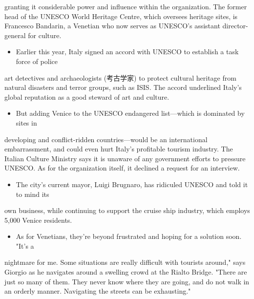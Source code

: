 \documentclass[UTF8,11pt]{ctexart}
\begin{document}
granting it considerable power and influence within the organization. The former head of the UNESCO World Heritage Centre, which oversees heritage sites, is Francesco Bandarin, a Venetian who now serves as UNESCO's assistant director-general for culture.


\begin{itemize}[leftmargin=2em,itemsep=.2em,topsep=.4em]\item[J.] Earlier this year, Italy signed an accord with UNESCO to establish a task force of police
\end{itemize}

art detectives and archaeologists (考古学家) to protect cultural heritage from natural disasters and terror groups, such as ISIS. The accord underlined Italy's global reputation as a good steward of art and culture.


\begin{itemize}[leftmargin=2em,itemsep=.2em,topsep=.4em]\item[K.] But adding Venice to the UNESCO endangered list—which is dominated by sites in
\end{itemize}

developing and conflict-ridden countries—would be an international embarrassment, and could even hurt Italy's profitable tourism industry. The Italian Culture Ministry says it is unaware of any government efforts to pressure UNESCO. As for the organization itself, it declined a request for an interview.


\begin{itemize}[leftmargin=2em,itemsep=.2em,topsep=.4em]\item[L.] The city's current mayor, Luigi Brugnaro, has ridiculed UNESCO and told it to mind its
\end{itemize}

own business, while continuing to support the cruise ship industry, which employs 5,000 Venice residents.


\begin{itemize}[leftmargin=2em,itemsep=.2em,topsep=.4em]\item[M.] As for Venetians, they're beyond frustrated and hoping for a solution soon. "It's a
\end{itemize}

nightmare for me. Some situations are really difficult with tourists around," says Giorgio as he navigates around a swelling crowd at the Rialto Bridge. "There are just so many of them. They never know where they are going, and do not walk in an orderly manner. Navigating the streets can be exhausting."
\end{document}
